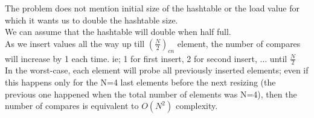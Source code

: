 \documentclass[11pt,fleqn]{article}
\begin{document}
The problem does not mention initial size of the hashtable or the load value for which it wants us to double the hashtable size.\\

We can assume that the hashtable will double when half full.\\

As we insert values all the way up till $(\frac{N}{2})_{cn}$ element, the number of compares will increase by 1 each time. ie; 1 for first insert, 2 for second insert, ... until $\frac{N}{2}$\\

In the worst-case, each element will probe all previously inserted elements; even if this
happens only for the N=4 last elements before the next resizing (the previous one happened
when the total number of elements was N=4), then the number of compares is equivalent to $O(N^2)$ complexity.
\end{document}
